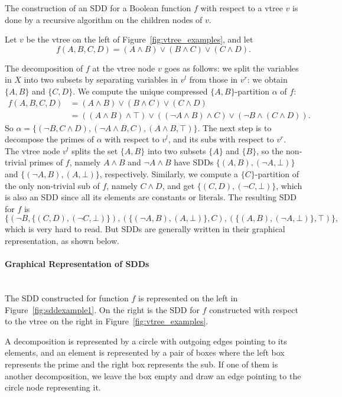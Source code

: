 \documentclass[11pt]{article}
\newcommand{\myparagraph}[1]{\paragraph{#1}\mbox{}\\}
\begin{document}
The construction of an SDD for a Boolean function $f$ with respect to a vtree $v$ is done by a recursive algorithm on the children nodes of $v$. 

Let $v$ be the vtree on the left of Figure~\ref{fig:vtree_examples}, and let $$f(A, B, C, D) = (A \land B) \lor (B \land C) \lor (C \land D).$$

The decomposition of $f$ at the vtree node $v$ goes as follows: we split the variables in $X$ into two subsets by separating variables in $v^l$ from those in $v^r$: we obtain $\{A, B\}$ and $\{C, D\}$. We compute the unique compressed $\{A, B\}$-partition $\alpha$ of $f$:
\begin{align*}
f(A, B, C, D) &= (A \land B) \lor (B \land C) \lor (C \land D)\\
&= ((A \land B) \land \top) \lor ((\lnot A \land B) \land C) \lor (\lnot B \land (C \land D)).
\end{align*}
So $\alpha = \{(\lnot B , C\land D), (\lnot A \land B, C), (A \land B, \top)\}$. The next step is to decompose the primes of $\alpha$ with respect to $v^l$, and its subs with respect to $v^r$. 
The vtree node $v^l$ splits the set $\{A, B\}$ into two subsets $\{A\}$ and $\{B\}$, so the non-trivial primes of $f$, namely $A \land B$ and $\lnot A \land B$ have SDDs $\{(A,B), (\lnot A, 
\bot)\}$ and $\{(\lnot A, B), (A, \bot)\}$, respectively. Similarly, we compute a $\{C\}$-partition of the only non-trivial sub of $f$, namely $C \land D$, and get $\{(C, D), (\lnot C, \bot)\}$, which is also an SDD since all its elements are constants or literals. 
The resulting SDD for $f$ is
$$\{(\lnot B , \{(C, D), (\lnot C, \bot)\}), (\{(\lnot A, B), (A, \bot)\}, C), (\{(A, B), (\lnot A, \bot)\}, \top)\},$$
which is very hard to read. But SDDs are generally written in their graphical representation, as shown below.

\myparagraph{Graphical Representation of SDDs}

The SDD constructed for function $f$ is represented on the left in Figure~\ref{fig:sddexample1}. On the right is the SDD for $f$ constructed with respect to the vtree on the right in Figure~\ref{fig:vtree_examples}.

A decomposition is represented by a circle with outgoing edges pointing to its elements, and an element is represented by a pair of boxes where the left box represents the prime and the right box represents the sub. If one of them is another decomposition, we leave the box empty and draw an edge pointing to the circle node representing it.
\end{document}
